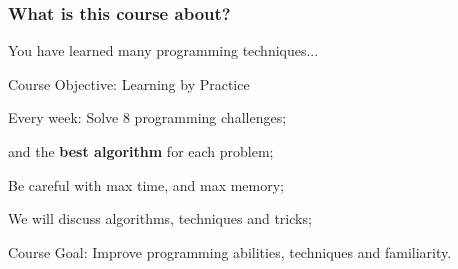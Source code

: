 \begin{frame}
  \frametitle{What is this course about?}

  You have learned many programming techniques...\\\hfill {}

  \begin{block}{Course Objective: Learning by Practice}
    \begin{itemize}
      {\small
    \item Every week: Solve 8 programming challenges;
    \item {} and  the {\bf best algorithm} for each problem;
    \item Be careful with \alert{max time}, and \alert{max memory};
    \item We will discuss algorithms, techniques and tricks;
      }
    \end{itemize}
  \end{block}

  \begin{exampleblock}{Course Goal:}
    Improve programming abilities, techniques and familiarity.
  \end{exampleblock}
\end{frame}

%
%
%
%
%
%



